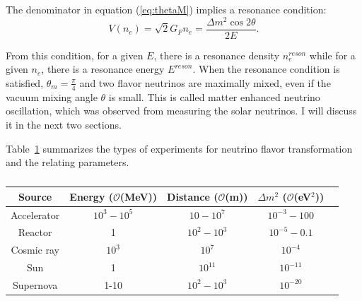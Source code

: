 The denominator in equation (\ref{eq:thetaM}) implies a resonance condition:
\begin{equation}\label{eq:reson_condition}
	V(n_e)=\sqrt 2G_Fn_e=\frac{\Delta m^2\cos2\theta}{2E}.
\end{equation}

From this condition, for a given $E$, there is a resonance density $n^{reson}_e$ while for a given $n_e$, there is a resonance energy $E^{reson}$. When the resonance condition is satisfied, $\theta_m = \frac{\pi}{4}$ and two flavor neutrinos are maximally mixed, even if the vacuum mixing angle $\theta$ is small. This is called matter enhanced neutrino oscillation\cite{smirnov2016solar,fukugita2013physics}, which was observed from measuring the solar neutrinos. I will discuss it in the next two sections.

%
%

Table~\ref{table:nuOscillation} summarizes the types of experiments for neutrino flavor transformation and the relating parameters\cite{giunti2007fundamentals,nagashima2014beyond}.
\vspace{1mm}
\begin{table}[ht]
	\centering
	\caption{}
	\label{table:nuOscillation}
	\begin{tabular}{ccccc}
		\toprule
		Source & Energy ($\mathcal{O}$(MeV)) & Distance ($\mathcal{O}$(m)) &  $\Delta m^2$ ($\mathcal{O}$(eV$^2$)) \\
		\hline 
	Accelerator & $10^3-10^5$ & $10-10^7$ & $10^{-3}-100$\\	
		\hline 
    Reactor	& 1 & $10^2-10^3$ & $10^{-5}-0.1$\\			
	 \hline 
	Cosmic ray	& $10^3$ & $10^7$ & $10^{-4}$\\		
	\hline
	Sun & 1 & $10^{11}$ & $10^{-11}$\\	
	 \hline
	Supernova & 1-10 & $10^2-10^3$ & $10^{-20}$\\	
 \bottomrule
	\end{tabular}
\end{table}
\vspace{1mm}

